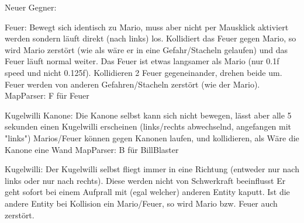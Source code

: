 Neuer Gegner: 

Feuer: 
	Bewegt sich identisch zu Mario, muss aber nicht per Mausklick aktiviert werden sondern läuft direkt (nach links) los.
	Kollidiert das Feuer gegen Mario, so wird Mario zerstört (wie als wäre er in eine Gefahr/Stacheln gelaufen) und das Feuer läuft normal weiter.
	Das Feuer ist etwas langsamer als Mario (nur 0.1f speed und nicht 0.125f).
	Kollidieren 2 Feuer gegeneinander, drehen beide um.
	Feuer werden von anderen Gefahren/Stacheln zerstört (wie der Mario).
	MapParser: F für Feuer

Kugelwilli Kanone: 
	Die Kanone selbst kann sich nicht bewegen, lässt aber alle 5 sekunden einen Kugelwilli erscheinen (links/rechts abwechselnd, angefangen mit "links")
	Marios/Feuer können gegen Kanonen laufen, und kollidieren, als Wäre die Kanone eine Wand
	MapParser: B für BillBlaster

Kugelwilli: 
	Der Kugelwilli selbst fliegt immer in eine Richtung (entweder nur nach links oder nur nach rechts).
	Diese werden nicht von Schwerkraft beeinflusst
	Er geht sofort bei einem Aufprall mit (egal welcher) anderen Entity kaputt.
	Ist die andere Entity bei Kollision ein Mario/Feuer, so wird Mario bzw. Feuer auch zerstört.